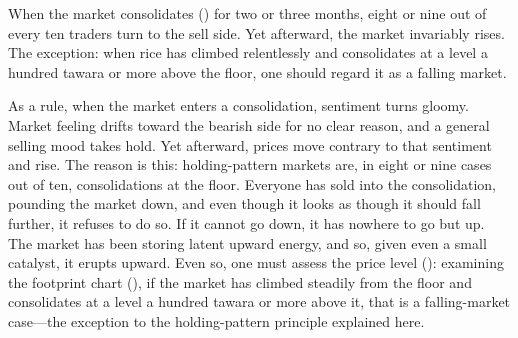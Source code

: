 
\begin{sokyubox}
{\small\itshape\color{sokyubar} }

\medskip
When the market consolidates () for two or three
months, eight or nine out of every ten traders turn to the sell
side. Yet afterward, the market invariably rises. The exception:
when rice has climbed relentlessly and consolidates at a level a
hundred tawara or more above the floor, one should regard it as a
falling market.
\end{sokyubox}

\commentary
As a rule, when the market enters a consolidation, sentiment turns
gloomy. Market feeling drifts toward the bearish side for no clear
reason, and a general selling mood takes hold. Yet afterward, prices
move contrary to that sentiment and rise. The reason is this:
holding-pattern markets are, in eight or nine cases out of ten,
consolidations at the floor. Everyone has sold into the
consolidation, pounding the market down, and even though it looks as
though it should fall further, it refuses to do so. If it cannot go
down, it has nowhere to go but up. The market has been storing
latent upward energy, and so, given even a small catalyst, it
erupts upward. Even so, one must assess the price level
(): examining the footprint chart
(), if the market has climbed steadily
from the floor and consolidates at a level a hundred tawara or more
above it, that is a falling-market case---the exception to the
holding-pattern principle explained here.
